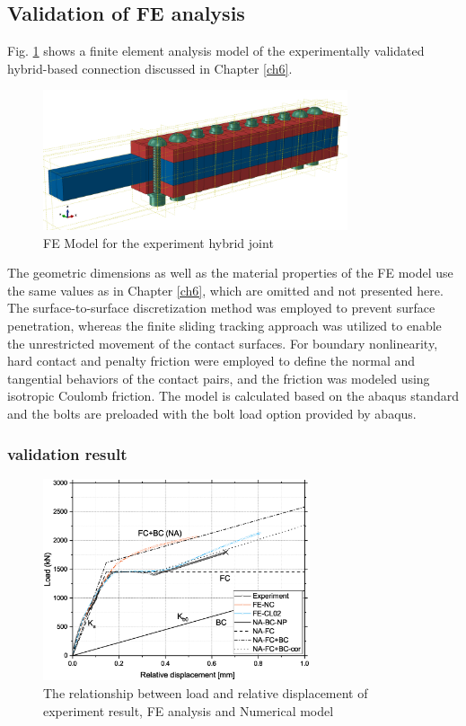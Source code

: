 \subsection{Validation of FE analysis}

Fig. \ref{fig-exp-fem} shows a finite element analysis model of the experimentally validated hybrid-based connection discussed in Chapter \ref{ch6}.

\begin{figure}[htbp]
    \centering
    \includegraphics[width=0.8\textwidth]{imgs/ch7/exp-fem.png}
    \caption{FE Model for the experiment hybrid joint}
    \label{fig-exp-fem}
\end{figure}

The geometric dimensions as well as the material properties of the FE model use the same values as in Chapter \ref{ch6}, which are omitted and not presented here. The surface-to-surface discretization method was employed to prevent surface penetration, whereas the finite sliding tracking approach was utilized to enable the unrestricted movement of the contact surfaces. For boundary nonlinearity, hard contact and penalty friction were employed to define the normal and tangential behaviors of the contact pairs, and the friction was modeled using isotropic Coulomb friction. The model is calculated based on the abaqus standard and the bolts are preloaded with the bolt load option provided by abaqus.


\subsubsection{validation result}

\begin{figure}[htbp]
    \centering
    \includegraphics[width=0.7\textwidth]{imgs/ch7/rd-valid.eps}
    \caption{The relationship between load and relative displacement of experiment result, FE analysis and Numerical model}
    \label{fig-rdvali}
\end{figure}

